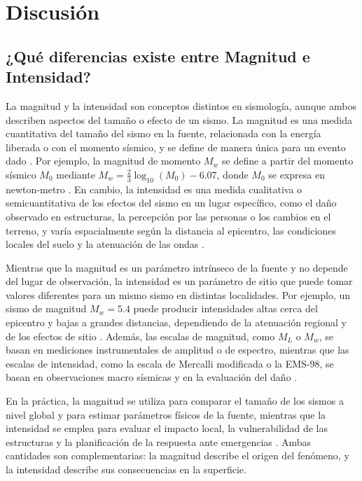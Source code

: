 \documentclass[a4paper,12pt]{article} %
\numberwithin{equation}{section} %
\numberwithin{figure}{section} %
\begin{document}
\section{Discusión}

\subsection{¿Qué diferencias existe entre Magnitud e Intensidad?}

La magnitud y la intensidad son conceptos distintos en sismología, aunque ambos describen aspectos del tamaño o efecto de un sismo. La magnitud es una medida cuantitativa del tamaño del sismo en la fuente, relacionada con la energía liberada o con el momento sísmico, y se define de manera única para un evento dado \cite{aki1980quantitative}. Por ejemplo, la magnitud de momento $M_w$ se define a partir del momento sísmico $M_0$ mediante $M_w=\frac{2}{3}\log_{10}(M_0)-6.07$, donde $M_0$ se expresa en newton-metro \cite{hanks1979moment}. En cambio, la intensidad es una medida cualitativa o semicuantitativa de los efectos del sismo en un lugar específico, como el daño observado en estructuras, la percepción por las personas o los cambios en el terreno, y varía espacialmente según la distancia al epicentro, las condiciones locales del suelo y la atenuación de las ondas \cite{wood1931new, musson2010intensity}.

Mientras que la magnitud es un parámetro intrínseco de la fuente y no depende del lugar de observación, la intensidad es un parámetro de sitio que puede tomar valores diferentes para un mismo sismo en distintas localidades. Por ejemplo, un sismo de magnitud $M_w=5.4$ puede producir intensidades altas cerca del epicentro y bajas a grandes distancias, dependiendo de la atenuación regional y de los efectos de sitio \cite{bormann2014new}. Además, las escalas de magnitud, como $M_L$ o $M_w$, se basan en mediciones instrumentales de amplitud o de espectro, mientras que las escalas de intensidad, como la escala de Mercalli modificada o la EMS-98, se basan en observaciones macro sísmicas y en la evaluación del daño \cite{wood1931new, grunthal1998ems}.

En la práctica, la magnitud se utiliza para comparar el tamaño de los sismos a nivel global y para estimar parámetros físicos de la fuente, mientras que la intensidad se emplea para evaluar el impacto local, la vulnerabilidad de las estructuras y la planificación de la respuesta ante emergencias \cite{musson2010intensity, gempa2026global}. Ambas cantidades son complementarias: la magnitud describe el origen del fenómeno, y la intensidad describe sus consecuencias en la superficie.
\end{document}
